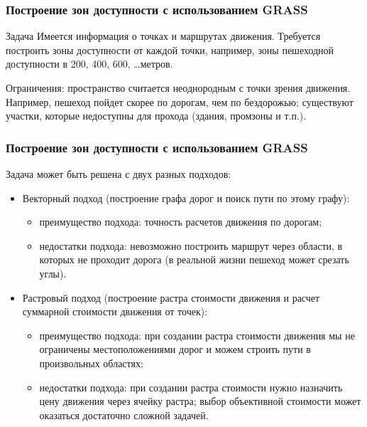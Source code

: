 
\begin{frame}
    \frametitle{Построение зон доступности с использованием GRASS}
    \begin{block}{Задача}
        Имеется информация о точках и маршрутах движения. Требуется построить зоны доступности от каждой точки, например,
        зоны пешеходной доступности в 200, 400, 600, \dots метров.

        Ограничения: пространство считается неоднородным с точки зрения движения. Например, пешеход пойдет скорее по дорогам, чем
        по бездорожью; существуют участки, которые недоступны для прохода (здания, промзоны и т.п.).
    \end{block}

\end{frame}

\begin{frame}
    \frametitle{Построение зон доступности с использованием GRASS}
    Задача может быть решена с двух разных подходов:
    \begin{itemize}
        \item Векторный подход (построение графа дорог и поиск пути по этому графу):
        \begin{itemize}
            \item преимущество подхода: точность расчетов движения по дорогам;
            \item недостатки подхода: невозможно построить маршрут через области, в которых не проходит дорога (в реальной жизни пешеход может срезать углы).
        \end{itemize}
        \item Растровый подход (построение растра стоимости движения и расчет суммарной стоимости движения от точек):
        \begin{itemize}
            \item преимущество подхода: при создании растра стоимости движения мы не ограничены местоположениями дорог и можем строить пути в произвольных областях;
            \item недостатки подхода: при создании растра стоимости нужно назначить цену движения через ячейку растра; выбор объективной стоимости может оказаться достаточно сложной задачей.
        \end{itemize}
    \end{itemize}
\end{frame}

